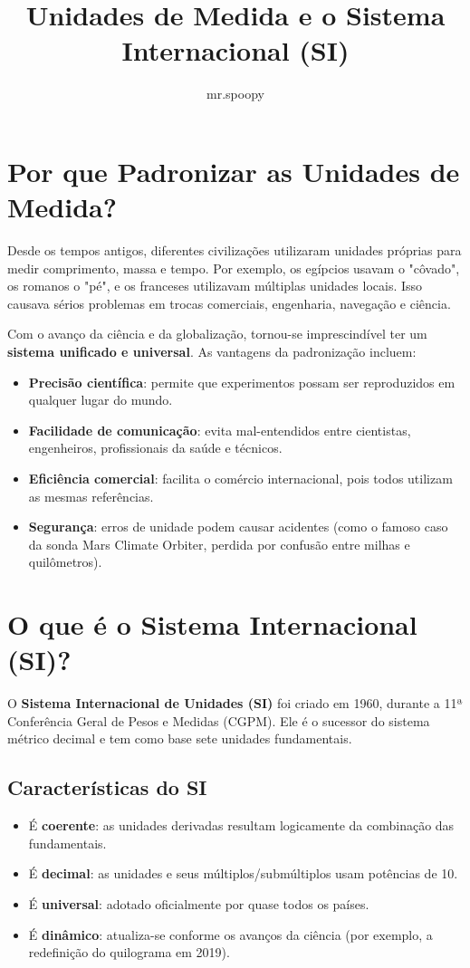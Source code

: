 \documentclass[portuguese,11pt,a4paper,oneside,onecolumn,notitlepage]{article}
\title{\textbf{Unidades de Medida e o Sistema Internacional (SI)}}
\author{mr.spoopy}
\date{}
\begin{document}
	\maketitle
	
	\section{Por que Padronizar as Unidades de Medida?}
	
	Desde os tempos antigos, diferentes civilizações utilizaram unidades próprias para medir comprimento, massa e tempo. Por exemplo, os egípcios usavam o "côvado", os romanos o "pé", e os franceses utilizavam múltiplas unidades locais. Isso causava sérios problemas em trocas comerciais, engenharia, navegação e ciência.
	
	Com o avanço da ciência e da globalização, tornou-se imprescindível ter um \textbf{sistema unificado e universal}. As vantagens da padronização incluem:
	
	\begin{itemize}
		\item \textbf{Precisão científica}: permite que experimentos possam ser reproduzidos em qualquer lugar do mundo.
		\item \textbf{Facilidade de comunicação}: evita mal-entendidos entre cientistas, engenheiros, profissionais da saúde e técnicos.
		\item \textbf{Eficiência comercial}: facilita o comércio internacional, pois todos utilizam as mesmas referências.
		\item \textbf{Segurança}: erros de unidade podem causar acidentes (como o famoso caso da sonda Mars Climate Orbiter, perdida por confusão entre milhas e quilômetros).
	\end{itemize}
	
	\section{O que é o Sistema Internacional (SI)?}
	
	O \textbf{Sistema Internacional de Unidades (SI)} foi criado em 1960, durante a 11ª Conferência Geral de Pesos e Medidas (CGPM). Ele é o sucessor do sistema métrico decimal e tem como base sete unidades fundamentais.
	
	\subsection*{Características do SI}
	\begin{itemize}
		\item É \textbf{coerente}: as unidades derivadas resultam logicamente da combinação das fundamentais.
		\item É \textbf{decimal}: as unidades e seus múltiplos/submúltiplos usam potências de 10.
		\item É \textbf{universal}: adotado oficialmente por quase todos os países.
		\item É \textbf{dinâmico}: atualiza-se conforme os avanços da ciência (por exemplo, a redefinição do quilograma em 2019).
	\end{itemize}
	
\end{document}
